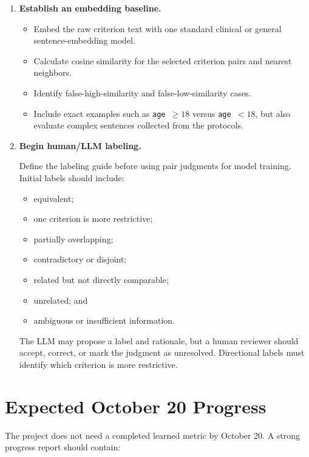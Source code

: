 \documentclass[11pt]{article}
\begin{document}
\begin{enumerate}
    \item \textbf{Establish an embedding baseline.}
    \begin{itemize}
        \item Embed the raw criterion text with one standard clinical or general sentence-embedding model.
        \item Calculate cosine similarity for the selected criterion pairs and nearest neighbors.
        \item Identify false-high-similarity and false-low-similarity cases.
        \item Include exact examples such as \texttt{age $\geq18$} versus \texttt{age $<18$}, but also evaluate complex sentences collected from the protocols.
    \end{itemize}

    \item \textbf{Begin human/LLM labeling.}

    Define the labeling guide before using pair judgments for model training. Initial labels should include:
    \begin{itemize}
        \item equivalent;
        \item one criterion is more restrictive;
        \item partially overlapping;
        \item contradictory or disjoint;
        \item related but not directly comparable;
        \item unrelated; and
        \item ambiguous or insufficient information.
    \end{itemize}

    The LLM may propose a label and rationale, but a human reviewer should accept, correct, or mark the judgment as unresolved. Directional labels must identify which criterion is more restrictive.
\end{enumerate}

\section{Expected October 20 Progress}

The project does not need a completed learned metric by October 20. A strong progress report should contain:
\end{document}
